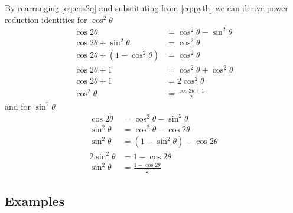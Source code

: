 By rearranging \eqref{eq:cos2q} and substituting from \eqref{eq:pyth} we can derive power reduction identities for $\cos^2 \theta$
\begin{align}
  \cos{2\theta} &= \cos^2 \theta - \sin^2\theta \nonumber \\
  \cos{2\theta} + \sin^2\theta &= \cos^2\theta \nonumber \\
  \cos{2\theta} + (1-\cos^2 \theta) &=\cos^2\theta \nonumber \\
  \cos{2\theta} + 1 &= \cos^2\theta + \cos^2\theta \nonumber \\
  \cos{2\theta}+1 &= 2 \cos^2\theta \nonumber \\
  \cos^2\theta &= \frac{\cos{2\theta}+1}{2}
  \label{eq:cossqq}
\end{align}
and for $\sin^2 \theta$
\begin{align}
  \cos{2\theta} &= \cos^2 \theta - \sin^2\theta \nonumber \\
  \sin^2 \theta &= \cos^2 \theta - \cos{2 \theta} \nonumber \\
  \sin^2 \theta &= (1-\sin^2 \theta) - \cos{2 \theta} \nonumber \\
  2 \sin^2 \theta &= 1-\cos{2\theta} \nonumber \\
  \sin^2 \theta &= \frac{1-\cos{2\theta}}{2}
  \label{eq:sinsqq}
\end{align}


\subsection{Examples}


